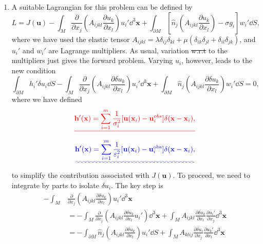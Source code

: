 \documentclass[a4paper,10pt]{paper}
\providecommand{\DIFadd}[1]{{\protect\color{blue}\uwave{#1}}} %
\providecommand{\DIFdel}[1]{{\protect\color{red}\sout{#1}}}                      %
\providecommand{\DIFaddbegin}{} %
\providecommand{\DIFaddend}{} %
\providecommand{\DIFdelbegin}{} %
\providecommand{\DIFdelend}{} %
\begin{document}
\begin{enumerate}
\item A suitable Lagrangian for this problem can be defined by
\begin{equation*}
    L=J(\mathbf{u})-\int_{M}\frac{\partial}{\partial x_{j}}\left(A_{ijkl}\frac{\partial u_{k}}{\partial x_{l}}\right)u_{i}'\dd^{3}\mathbf{x}+\int_{\partial M}\left[\hat{n}_{j}\left(A_{ijkl}\frac{\partial u_{k}}{\partial x_{l}}\right)-\sigma g_{i}\right]w_{i}'\dd S,
\end{equation*}
where we have used the elastic tensor $A_{ijkl}=\lambda\delta_{ij}\delta_{kl}+\mu(\delta_{ik}\delta_{jl}+\delta_{il}\delta_{jk})$, and $u_{i}'$ and $w_{i}'$ are Lagrange multipliers. As usual, variation \DIFdelbegin \DIFdel{w.r.t }\DIFdelend \DIFaddbegin \DIFadd{with respect }\DIFaddend to the multipliers just gives the forward problem. Varying $u_{i}$, however, leads to the new condition
\begin{equation*}
    \int_{\partial M}h_{i}'\delta u_{i}\dd S-\int_{M}\frac{\partial}{\partial x_{j}}\left(A_{ijkl}\frac{\partial\delta u_{k}}{\partial x_{l}}\right)u_{i}'\dd^{3}\mathbf{x}+\int_{\partial M}\hat{n}_{j}\left(A_{ijkl}\frac{\partial\delta u_{k}}{\partial x_{l}}\right)w_{i}'\dd S=0,
\end{equation*}
where we have defined
\DIFdelbegin \begin{displaymath}
    \DIFdel{\mathbf{h}'(\mathbf{x})=\sum_{i=1}^{m}\frac{1}{\sigma_{i}^{2}}[\mathbf{u}(\mathbf{x}_{i})-\mathbf{u}_{i}^{obs}]\delta(\mathbf{x}-\mathbf{x}_{i}),
}\end{displaymath}%
\DIFdelend \DIFaddbegin \begin{equation*}
    \DIFadd{\mathbf{h}'(\mathbf{x})=\sum_{i=1}^{m}\frac{1}{\varepsilon_{i}^{2}}[\mathbf{u}(\mathbf{x}_{i})-\mathbf{u}_{i}^{\mathrm{obs}}]\delta(\mathbf{x}-\mathbf{x}_{i}),
}\end{equation*}\DIFaddend 
to simplify the contribution associated with $J(\mathbf{u})$. To proceed, we need to integrate by parts to isolate $\delta u_{i}$. The key step is
\begin{align*}
    -\int_{M}&\frac{\partial}{\partial x_{j}}\left(A_{ijkl}\frac{\partial\delta u_{k}}{\partial x_{l}}\right)u_{i}'\dd^{3}\mathbf{x} \\
    &=-\int_{M}\frac{\partial}{\partial x_{j}}\left(A_{ijkl}\frac{\partial\delta u_{k}}{\partial x_{l}}u_{i}'\right)\dd^{3}\mathbf{x}+\int_{M}A_{ijkl}\frac{\partial\delta u_{k}}{\partial x_{l}}\frac{\partial u_{i}'}{\partial x_{j}}\dd^{3}\mathbf{x} \\
    &=-\int_{\partial M}\hat{n}_{j}\left(A_{ijkl}\frac{\partial\delta u_{k}}{\partial x_{l}}\right)u_{i}'\dd S+\int_{M}A_{klij}\frac{\partial\delta u_{i}}{\partial x_{j}}\frac{\partial u_{k}'}{\partial x_{l}}\dd^{3}\mathbf{x} \\

\end{align*}
\end{enumerate}
\end{document}
